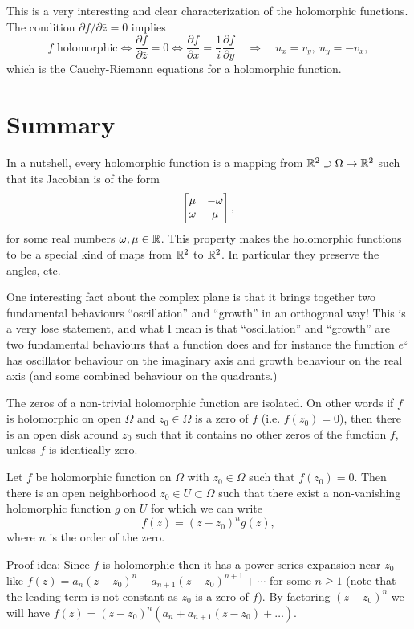 This is a very interesting and clear characterization of the holomorphic functions. The condition $ \partial f/\partial \bar{z} = 0 $ implies 
\[ \boxed{f \text{ holomorphic}} \Longleftrightarrow \boxed{\frac{\partial f}{\partial \bar{z}} = 0} \Longleftrightarrow \boxed{\frac{\partial f}{\partial x} = \frac{1}{i}\frac{\partial f}{\partial y}} \quad \Longrightarrow \quad \boxed{u_x = v_y,\ u_y = -v_x}, \]
which is the Cauchy-Riemann equations for a holomorphic function.



\section{Summary}
\begin{summary}
	In a nutshell, every holomorphic function is a mapping from $ \mathbb{R}^2\supset\Omega\to\mathbb{R}^2 $ such that its Jacobian is of the form
	\[ \begin{bmatrix} \mu & -\omega \\ \omega & \mu \end{bmatrix}, \]
	for some real numbers $ \omega, \mu \in \mathbb{R} $. This property makes the holomorphic functions to be a special kind of maps from $ \mathbb{R}^2 $ to $ \mathbb{R}^2 $. In particular they preserve the angles, etc. 
\end{summary}

\begin{summary}
	One interesting fact about the complex plane is that it brings together two fundamental behaviours ``oscillation'' and ``growth'' in an orthogonal way! This is a very lose statement, and what I mean is that ``oscillation'' and ``growth'' are two fundamental behaviours that a function does and for instance the function $ e^z $ has oscillator behaviour on the imaginary axis and growth behaviour on the real axis (and some combined behaviour on the quadrants.) 
\end{summary}

\begin{summary}
	The zeros of a non-trivial holomorphic function are isolated. On other words if $ f $ is holomorphic on open $ \Omega $ and $ z_0 \in \Omega $ is a zero of $ f $ (i.e. $ f(z_0) = 0 $), then there is an open disk around $ z_0 $ such that it contains no other zeros of the function $ f $, unless $ f $ is identically zero.
\end{summary}

\begin{theorem}
	Let $ f $ be holomorphic function on $ \Omega $ with $ z_0\in \Omega $ such that $ f(z_0) = 0 $. Then there is an open neighborhood $ z_0 \in U \subset \Omega $ such that there exist a non-vanishing holomorphic function $ g $ on $ U $ for which we can write
	\[ f(z) = (z-z_0)^n g(z), \]
	where $ n $ is the order of the zero.
\end{theorem}
\begin{remark}
	Proof idea: Since $ f $ is holomorphic then it has a power series expansion near $ z_0 $ like $ f(z) = a_n(z-z_0)^n + a_{n+1}(z-z_0)^{n+1}+\cdots $ for some $ n\geq 1 $ (note that the leading term is not constant as $ z_0 $ is a zero of $ f $). By factoring $ (z-z_0)^n $ we will have $ f(z) = (z-z_0)^n (a_n + a_{n+1}(z-z_0)+ \dots) $. 
\end{remark}

